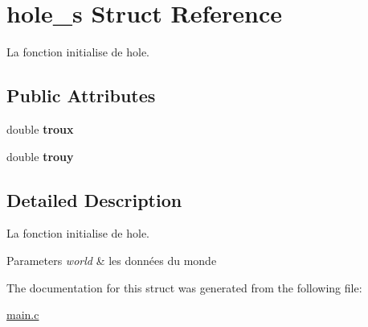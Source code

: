 \hypertarget{structhole__s}{\section{hole\-\_\-s Struct Reference}
\label{structhole__s}
}


La fonction initialise de hole.  


\subsection*{Public Attributes}
\begin{DoxyCompactItemize}
\item 
\hypertarget{structhole__s_a797d6e7e437f73feee937e9db1607710}{double {\bfseries troux}}\label{structhole__s_a797d6e7e437f73feee937e9db1607710}

\item 
\hypertarget{structhole__s_a1324778aea13703d99a6d325e9d8af84}{double {\bfseries trouy}}\label{structhole__s_a1324778aea13703d99a6d325e9d8af84}

\end{DoxyCompactItemize}


\subsection{Detailed Description}
La fonction initialise de hole. 


\begin{DoxyParams}{Parameters}
{\em world} & les données du monde \\
\hline
\end{DoxyParams}


The documentation for this struct was generated from the following file\-:\begin{DoxyCompactItemize}
\item 
\hyperlink{main_8c}{main.\-c}\end{DoxyCompactItemize}
